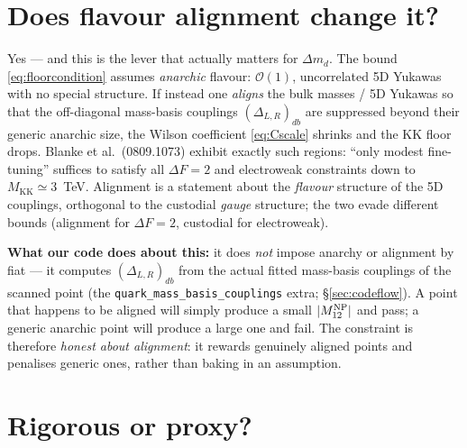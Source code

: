 \documentclass[11pt]{article}
\newcommand{\MKK}{M_{\mathrm{KK}}}
\newcommand{\Mtwelve}{M_{12}}
\newcommand{\dmd}{\Delta m_d}
\newcommand{\code}[1]{\texttt{#1}}
\theoremstyle{definition}
\begin{document}
\section{Does flavour alignment change it?}
\label{sec:alignment}

Yes --- and this is the lever that actually matters for $\dmd$. The bound
\eqref{eq:floorcondition} assumes \emph{anarchic} flavour: $\mathcal{O}(1)$,
uncorrelated 5D Yukawas with no special structure. If instead one
\emph{aligns} the bulk masses / 5D Yukawas so that the off-diagonal mass-basis
couplings $(\Delta_{L,R})_{db}$ are suppressed beyond their generic anarchic
size, the Wilson coefficient \eqref{eq:Cscale} shrinks and the KK floor drops.
Blanke et al.\ (0809.1073) exhibit exactly such regions: ``only modest
fine-tuning'' suffices to satisfy all $\Delta F=2$ and electroweak constraints
down to $\MKK\simeq3$~TeV. Alignment is a statement about the \emph{flavour}
structure of the 5D couplings, orthogonal to the custodial \emph{gauge}
structure; the two evade different bounds (alignment for $\Delta F=2$, custodial
for electroweak).

\textbf{What our code does about this:} it does \emph{not} impose anarchy or
alignment by fiat --- it computes $(\Delta_{L,R})_{db}$ from the actual fitted
mass-basis couplings of the scanned point (the \code{quark\_mass\_basis\_couplings}
extra; \S\ref{sec:codeflow}). A point that happens to be aligned will simply
produce a small $|\Mtwelve^{\rm NP}|$ and pass; a generic anarchic point will
produce a large one and fail. The constraint is therefore \emph{honest about
alignment}: it rewards genuinely aligned points and penalises generic ones,
rather than baking in an assumption.

\section{Rigorous or proxy?}
\label{sec:rigor}
\end{document}
